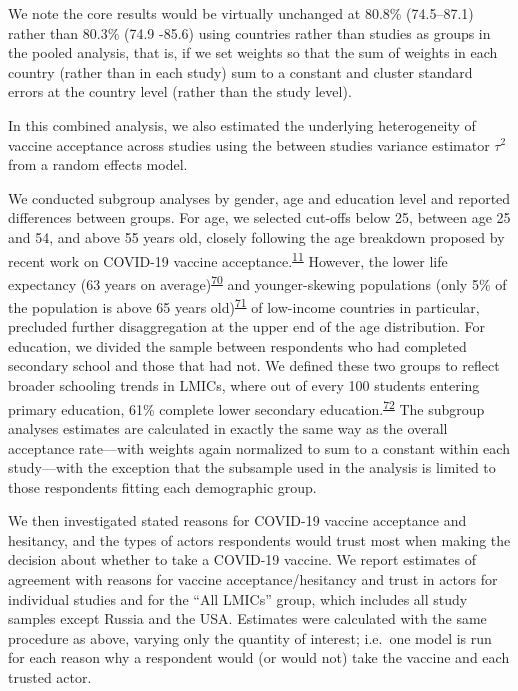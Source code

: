 \documentclass[
  12pt,
]{article}
\begin{document}
We note the core results would be virtually unchanged at 80.8\% (74.5--87.1) rather than 80.3\% (74.9 -85.6) using countries rather than studies as groups in the pooled analysis, that is, if we set weights so that the sum of weights in each country (rather than in each study) sum to a constant and cluster standard errors at the country level (rather than the study level).

In this combined analysis, we also estimated the underlying heterogeneity of vaccine acceptance across studies using the between studies variance estimator \(\tau^2\) from a random effects model.

We conducted subgroup analyses by gender, age and education level and reported differences between groups. For age, we selected cut-offs below 25, between age 25 and 54, and above 55 years old, closely following the age breakdown proposed by recent work on COVID-19 vaccine acceptance.\textsuperscript{\protect\hyperlink{ref-lazarus2020nature}{11}} However, the lower life expectancy (63 years on average)\textsuperscript{\protect\hyperlink{ref-wbage}{70}} and younger-skewing populations (only 5\% of the population is above 65 years old)\textsuperscript{\protect\hyperlink{ref-WorldBanksubSahara}{71}} of low-income countries in particular, precluded further disaggregation at the upper end of the age distribution. For education, we divided the sample between respondents who had completed secondary school and those that had not. We defined these two groups to reflect broader schooling trends in LMICs, where out of every 100 students entering primary education, 61\% complete lower secondary education.\textsuperscript{\protect\hyperlink{ref-world2017world}{72}} The subgroup analyses estimates are calculated in exactly the same way as the overall acceptance rate---with weights again normalized to sum to a constant within each study---with the exception that the subsample used in the analysis is limited to those respondents fitting each demographic group.

We then investigated stated reasons for COVID-19 vaccine acceptance and hesitancy, and the types of actors respondents would trust most when making the decision about whether to take a COVID-19 vaccine. We report estimates of agreement with reasons for vaccine acceptance/hesitancy and trust in actors for individual studies and for the ``All LMICs'' group, which includes all study samples except Russia and the USA. Estimates were calculated with the same procedure as above, varying only the quantity of interest; i.e.~one model is run for each reason why a respondent would (or would not) take the vaccine and each trusted actor.
\end{document}
